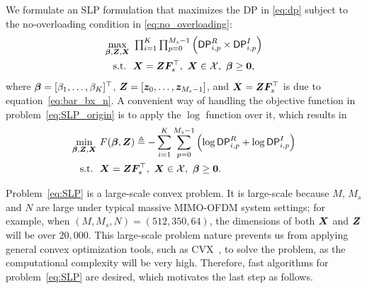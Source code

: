 \documentclass[10pt,twocolumn,twoside]{IEEEtran}
\begin{document}

We formulate an SLP formulation that maximizes the DP in \eqref{eq:dp} subject to the no-overloading condition in \eqref{eq:no_overloading}:
\begin{equation}\label{eq:SLP_origin}
	\begin{aligned}
		\max_{  \bm \beta, {\bm Z}, {\bm X} }
		& ~ \textstyle \prod_{i=1}^K \prod_{p=0}^{M_s-1}\left( {\sf DP}^R_{i,p} \times {\sf DP}^I_{i,p} \right) \\
		{\rm s.t.} ~
		&  ~ {\bm X} = {\bm Z} {\bm F}_s^\top,~ {\bm X} \in \mathcal{X},~ \bm \beta \ge \bm 0,
	\end{aligned}
\end{equation}
where $\bm \beta = [\beta_1,\dots,\beta_K]^\top$,
${\bm Z} = [{\bm z}_0,\dots,{\bm z}_{M_s-1}]$,
and ${\bm X} = {\bm Z} {\bm F}_s^\top$ is due to equation~\eqref{eq:bar_bx_n}.
A convenient way of handling the objective function in problem~\eqref{eq:SLP_origin} is to apply the $\log$ function over it, which results in
\begin{equation}\label{eq:SLP}
	\begin{aligned}
		\min_{ \bm \beta, {\bm Z}, {\bm X} }
		& ~
		F(\bm \beta, {\bm Z}) \triangleq -
		\sum_{i=1}^{K} \sum_{p=0}^{M_s-1} \left(\log {\sf DP}^R_{i,p} + \log {\sf DP}^I_{i,p} \right) \\
		{\rm s.t.} ~
		& ~ {\bm X} = {\bm Z} {\bm F}_s^\top,~ {\bm X} \in \mathcal{X},~ \bm \beta \ge \bm 0.
	\end{aligned}
\end{equation}



\noindent
Problem~\eqref{eq:SLP} is a large-scale convex problem.
It is large-scale because $M$, $M_s$ and $N$ are large under typical massive MIMO-OFDM system settings;
for example, when $(M,M_s,N)=(512,350,64)$, the dimensions of both ${\bm X}$ and ${\bm Z}$ will be over $20,000$.
This large-scale problem nature prevents us from applying general convex optimization tools, such as CVX~\cite{grant2008cvx}, to solve the problem, as the computational complexity will be very high.
Therefore, fast algorithms for problem~\eqref{eq:SLP} are desired, which motivates the last step as follows.
\end{document}
